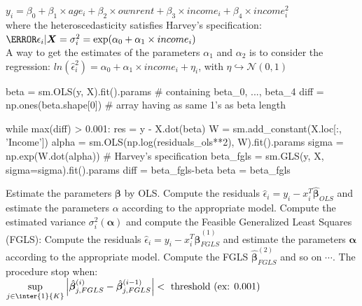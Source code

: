 \begin{enumerate}
		$y_{i} = \beta_{0} + \beta_{1}\times age_{i} + \beta_{2}\times ownrent + \beta_{3}
		\times income_{i} + \beta_{4}\times income_{i}^{2}$\\ where the heteroscedasticity
		satisfies Harvey's specification:\\
		$\V{\epsilon_{i}|\bm{X}}=\sigma_{i}^{2}=\exp(\alpha_{0}+\alpha_{1}\times 
		income_{i})$\\
		A way to get the estimates of the parameters $\alpha_{1}$ and $\alpha_{2}$ is to
		consider the regression: $ln\left(\hat{\epsilon}_{i}^{2}\right)=\alpha_{0}+
		\alpha_{1}\times income_{i} + \eta_{i}$, with 
		$\eta\hookrightarrow\mathcal{N}(0,1)$
\begin{python}
beta = sm.OLS(y, X).fit().params # containing beta_0, ..., beta_4
diff = np.ones(beta.shape[0]) # array having as same 1's as beta length  

while max(diff) > 0.001:
    res = y - X.dot(beta)
    W = sm.add_constant(X.loc[:, 'Income']) 
    alpha = sm.OLS(np.log(residuals_ols**2), W).fit().params
    sigma = np.exp(W.dot(alpha)) # Harvey's specification
    beta_fgls = sm.GLS(y, X, sigma=sigma).fit().params
    diff = beta_fgls-beta
    beta = beta_fgls
\end{python}
	
		Estimate the parameters $\bm{\beta}$ by OLS. Compute the residuals 
		$\hat{\epsilon}_{i} = y_{i}-x_{i}^{T}\hat{\bm{\beta}}_{OLS}$ and estimate the 
		parameters $\alpha$ according to the appropriate model. Compute the estimated 
		variance $\sigma_{i}^{2}(\bm{\alpha})$ and compute the Feasible Generalized Least
		Squares (FGLS):
		Compute the residuals $\hat{\epsilon}_{i}=y_{i}-x_{i}^{T}\hat{\bm{
		\beta}}_{FGLS}^{(1)}$ and estimate the parameters $\bm{\alpha}$ according to the
		appropriate model. Compute the FGLS $\hat{\bm{\beta}}_{FGLS}^{(2)}$ and so on 
		$\cdots$. The procedure stop when:\\
		$\sup\limits_{j\in\inter{1}{K}}\left|\hat{\bm{\beta}}_{j,FGLS}^{(i)}-
		\hat{\bm{\beta}}_{j,FGLS}^{(i-1)}\right|<\text{ threshold (ex: 0.001)}$\\
		
\end{enumerate}

